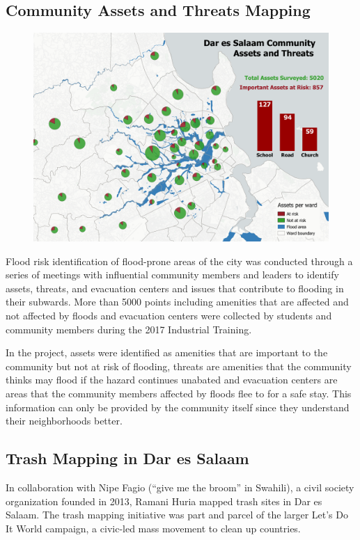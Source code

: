 \documentclass[a4paper,12pt,twoside]{article}
\begin{document}
\subsection{Community Assets and Threats Mapping}
\begin{figure}[h]
    \centering
    \includegraphics[width=.8\textwidth]{images/asset_pie_min.png}
    \label{fig:my_label}
\end{figure}
Flood risk identification of flood-prone areas of the city was conducted through a series of meetings with influential community members and leaders to identify assets, threats, and evacuation centers and issues that contribute to flooding in their subwards. More than 5000 points including amenities that are affected and not affected by floods and evacuation centers were collected by students and community members during the 2017 Industrial Training.

In the project, assets were identified as amenities that are important to the community but not at risk of flooding, threats are amenities that the community thinks may flood if the hazard continues unabated and evacuation centers are areas that the community members affected by floods flee to for a safe stay. This information can only be provided by the community itself since they understand their neighborhoods better.


\subsection{Trash Mapping in Dar es Salaam}
In collaboration with Nipe Fagio (“give me the broom” in Swahili), a civil society organization founded in 2013, Ramani Huria mapped trash sites in Dar es Salaam. The trash mapping initiative was part and parcel of the larger Let’s Do It World campaign, a civic-led mass movement to clean up countries.
\end{document}
